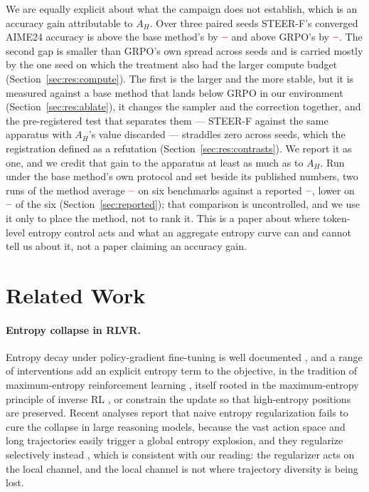 \documentclass[11pt]{article}
\newcommand{\AH}{A_{H}}
\providecommand{\PENDING}{\textcolor{red}{\textbf{--}}}
\newcommand{\num}[1]{\ifcsname #1\endcsname\csname #1\endcsname\else\PENDING\fi}
\begin{document}
We are equally explicit about what the campaign does not establish, which is an
accuracy gain attributable to $\AH$. Over three paired seeds STEER-F's converged
AIME24 accuracy is above the base method's by $\num{Csignedsteeracc}$ and above GRPO's
by $\num{Csignedgrpoacc}$. The second gap is smaller than GRPO's own spread across
seeds and is carried mostly by the one seed on which the treatment also had the
larger compute budget (Section~\ref{sec:res:compute}). The first is the larger and
the more stable, but it is measured against a base method that lands below GRPO in
our environment (Section~\ref{sec:res:ablate}), it changes the sampler and the
correction together, and the
pre-registered test that separates them --- STEER-F against the same apparatus with
$\AH$'s value discarded --- straddles zero across seeds, which the registration
defined as a refutation (Section~\ref{sec:res:contrasts}). We report it as one, and
we credit that gain to the apparatus at least as much as to $\AH$. Run under the base
method's own protocol and set beside its published numbers, two runs of the method
average $\num{ProtobestMeanAvg}$ on six benchmarks against a reported
$\num{ProtorefSteerAvg}$, lower on $\num{ProtocmpSteerBelow}$ of the six
(Section~\ref{sec:reported}); that comparison is uncontrolled, and we use it only to
place the method, not to rank it. This is a
paper about where token-level entropy control acts and what an aggregate entropy
curve can and cannot tell us about it, not a paper claiming an accuracy gain.

\section{Related Work}
\label{sec:related}

\paragraph{Entropy collapse in RLVR.}
Entropy decay under policy-gradient fine-tuning is well documented
\citep{cui2025bentropy}, and a range of interventions add an explicit entropy term
to the objective, in the tradition of maximum-entropy reinforcement learning
\citep{haarnoja2018soft}, itself rooted in the maximum-entropy principle of inverse
RL \citep{ziebart2008maximum}, or constrain the update so that high-entropy positions
are preserved. Recent analyses report that naive entropy regularization fails to cure
the collapse in large reasoning models, because the vast action space and long
trajectories easily trigger a global entropy explosion, and they regularize
selectively instead \citep{rethinkingentropyreg}, which is consistent with
our reading: the regularizer acts on the local channel, and the local channel is
not where trajectory diversity is being lost.
\end{document}
